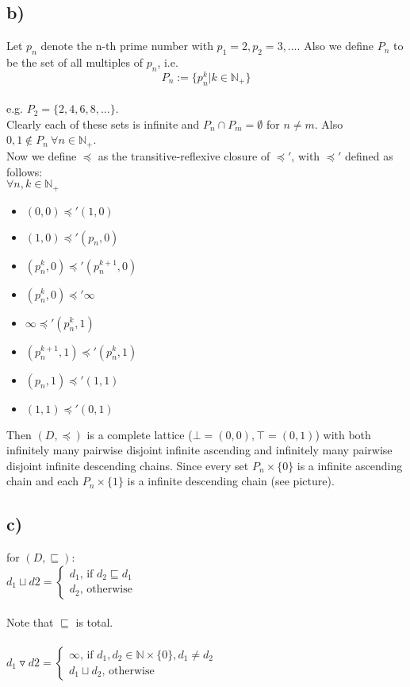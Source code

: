 \documentclass[fleqn,12pt]{article}
\begin{document}
\subsection*{b)}
Let $p_n$ denote the n-th prime number with $p_1=2, p_2=3, \dots$.
Also we define $P_n$ to be the set of all multiples of $p_n$, i.e. $$P_n := \{p_n^k | k \in \mathbb{N}_+\}$$\\
e.g. $P_2 = \{2,4,6,8,\dots \}$.\\
Clearly each of these sets is infinite and $P_n \cap P_m = \emptyset$ for $n\neq m$. Also $0,1 \not \in P_n \ \forall n \in \mathbb{N}_+$.\\
Now we define $\preceq$ as the transitive-reflexive closure of $\preceq'$, with $\preceq'$ defined as follows:\\
$\forall n,k\in \mathbb{N}_+$
\begin{itemize}
\item $(0,0) \preceq' (1,0)$
\item $(1,0) \preceq' (p_n,0)$
\item $(p_n^k,0) \preceq' (p_n^{k+1},0)$
\item $(p_n^k,0) \preceq' \infty$

\item $\infty \preceq' (p_n^k,1)$
\item $(p_n^{k+1},1) \preceq' (p_n^k,1)$
\item $(p_n,1) \preceq' (1,1)$
\item $(1,1) \preceq' (0,1)$
\end{itemize}
Then $(D,\preceq)$ is a complete lattice ($\bot=(0,0),\top=(0,1)$) with both infinitely many
pairwise disjoint infinite ascending and infinitely many pairwise disjoint infinite descending chains.
Since every set $P_n \times \{0\}$ is a infinite ascending chain and each $P_n \times \{1\}$ is a infinite descending chain (see picture).
\subsection*{c)}
for $(D,\sqsubseteq)$:\\
$d_1 \sqcup d2 =
\begin{cases}
d_1 \text{, if } d_2 \sqsubseteq d_1 \\
d_2 \text{, otherwise}
\end{cases}$\\\\
Note that $\sqsubseteq$ is total.\\\\
$d_1 \triangledown d2 =
\begin{cases}
\infty \text{, if } d_1,d_2 \in \mathbb{N} \times \{0\}, d_1 \neq d_2 \\
d_1 \sqcup d_2 \text{, otherwise}
\end{cases}$\\\\
\end{document}
